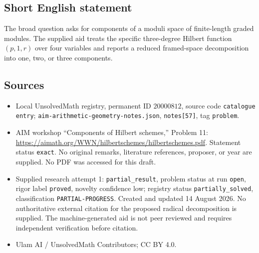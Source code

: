 \documentclass[11pt]{article}
\begin{document}
\subsection{Short English statement}
The broad question asks for components of a moduli space of finite-length graded modules. The supplied aid treats the specific three-degree Hilbert function \((p,1,r)\) over four variables and reports a reduced framed-space decomposition into one, two, or three components.
\subsection{Sources}
\begin{itemize}
\item Local UnsolvedMath registry, permanent ID \(20000812\), source code \texttt{catalogue entry}; \texttt{aim-arithmetic-geometry-notes.json}, \texttt{notes[57]}, tag \texttt{problem}.
\item AIM workshop ``Components of Hilbert schemes,'' Problem 11: \url{https://aimath.org/WWN/hilbertschemes/hilbertschemes.pdf}. Statement status \texttt{exact}. No original remarks, literature references, proposer, or year are supplied. No PDF was accessed for this draft.
\item Supplied research attempt 1: \texttt{partial\_result}, problem status at run \texttt{open}, rigor label \texttt{proved}, novelty confidence low; registry status \texttt{partially\_solved}, classification \texttt{PARTIAL-PROGRESS}. Created and updated 14 August 2026. No authoritative external citation for the proposed radical decomposition is supplied. The machine-generated aid is not peer reviewed and requires independent verification before citation.
\item Ulam AI / UnsolvedMath Contributors; CC BY 4.0.
\end{itemize}
\end{document}
